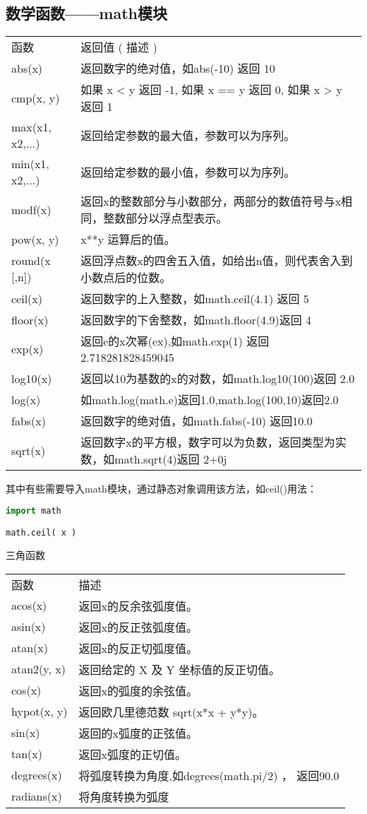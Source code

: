 \subsection{数学函数——math模块}
\begin{tabular}{l|l}
函数&	返回值 ( 描述 )\\
abs(x)&	返回数字的绝对值，如abs(-10) 返回 10\\
cmp(x, y)&	如果 x < y 返回 -1, 如果 x == y 返回 0, 如果 x > y 返回 1\\
max(x1, x2,...)&	返回给定参数的最大值，参数可以为序列。\\
min(x1, x2,...)&	返回给定参数的最小值，参数可以为序列。\\
modf(x)&	返回x的整数部分与小数部分，两部分的数值符号与x相同，整数部分以浮点型表示。\\
pow(x, y)&	x**y 运算后的值。\\
round(x [,n])&	返回浮点数x的四舍五入值，如给出n值，则代表舍入到小数点后的位数。\\
ceil(x)	&返回数字的上入整数，如math.ceil(4.1) 返回 5\\
floor(x)	&返回数字的下舍整数，如math.floor(4.9)返回 4\\
exp(x)	&返回e的x次幂(ex),如math.exp(1) 返回2.718281828459045\\
log10(x)&	返回以10为基数的x的对数，如math.log10(100)返回 2.0\\
log(x)	&如math.log(math.e)返回1.0,math.log(100,10)返回2.0\\
fabs(x)	&返回数字的绝对值，如math.fabs(-10) 返回10.0\\
sqrt(x)&	返回数字x的平方根，数字可以为负数，返回类型为实数，如math.sqrt(4)返回 2+0j
\end{tabular}

其中有些需要导入math模块，通过静态对象调用该方法，如ceil()用法：
\begin{lstlisting}[language=Python]
import math

math.ceil( x )
\end{lstlisting}


三角函数

\begin{tabular}{l|l}
函数	&描述\\
acos(x)	&返回x的反余弦弧度值。\\
asin(x)	&返回x的反正弦弧度值。\\	
atan(x)	&返回x的反正切弧度值。\\
atan2(y, x)&	返回给定的 X 及 Y 坐标值的反正切值。\\
cos(x)&	返回x的弧度的余弦值。\\
hypot(x, y)&	返回欧几里德范数 sqrt(x*x + y*y)。\\
sin(x)&	返回的x弧度的正弦值。\\
tan(x)	&返回x弧度的正切值。\\
degrees(x)&	将弧度转换为角度,如degrees(math.pi/2) ， 返回90.0\\
radians(x)	&将角度转换为弧度
\end{tabular}





